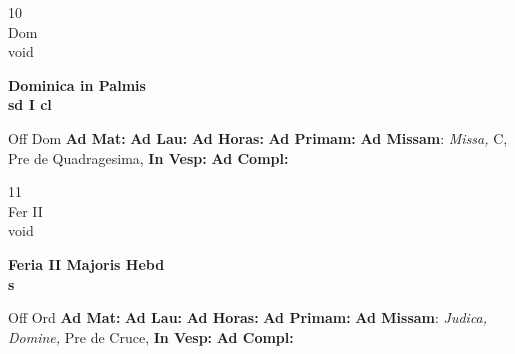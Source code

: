 \documentclass[10pt, openany]{book}
\begin{document}
    \begin{center}
        \begin{minipage}{3.5in}
            \vspace{2em}
            \begin{minipage}{0.5in}
                {\Huge 10} \\
                {\normalsize Dom} \\
                {\normalsize void}
            \end{minipage}
            \begin{minipage}{3.0in}
                \textbf{ \large Dominica in Palmis \\
                \textnormal{\normalsize sd I cl}} \\ 
            \end{minipage}
            \begin{justify}Off Dom
                \textbf{Ad Mat: }
                \textbf{Ad Lau: }
                \textbf{Ad Horas: }
                \textbf{Ad Primam: }\textbf{Ad Missam}: \textit{Missa,} C, Pre de Quadragesima,  
                \textbf{In Vesp: }
                \textbf{Ad Compl: }
            \end{justify}
        \end{minipage}
    \end{center}

    \begin{center}
        \begin{minipage}{3.5in}
            \vspace{2em}
            \begin{minipage}{0.5in}
                {\Huge 11} \\
                {\normalsize Fer II} \\
                {\normalsize void}
            \end{minipage}
            \begin{minipage}{3.0in}
                \textbf{ \large Feria II Majoris Hebd \\
                \textnormal{\normalsize s}} \\ 
            \end{minipage}
            \begin{justify}Off Ord
                \textbf{Ad Mat: }
                \textbf{Ad Lau: }
                \textbf{Ad Horas: }
                \textbf{Ad Primam: }\textbf{Ad Missam}: \textit{Judica, Domine,} Pre de Cruce,  
                \textbf{In Vesp: }
                \textbf{Ad Compl: }
            \end{justify}
        \end{minipage}
    \end{center}
\end{document}

